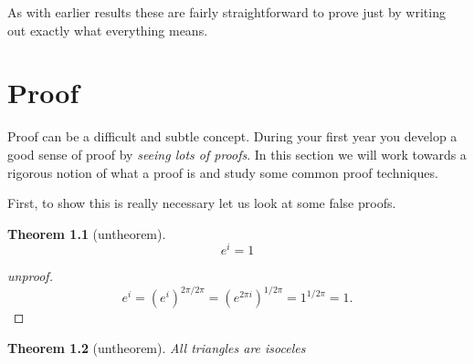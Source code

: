 \documentclass[
]{book}
\newtheorem{theorem}{Theorem}[chapter]
\theoremstyle{definition}
\theoremstyle{definition}
\theoremstyle{definition}
\theoremstyle{definition}
\theoremstyle{remark}
\begin{document}
As with earlier results these are fairly straightforward to prove just by writing out exactly what everything means.

\chapter{Proof}\label{proof}

Proof can be a difficult and subtle concept. During your first year you develop a good sense of proof by \emph{seeing lots of proofs}. In this section we will work towards a rigorous notion of what a proof is and study some common proof techniques.

First, to show this is really necessary let us look at some false proofs.

\begin{theorem}[untheorem]
\[e^i =1\]
\end{theorem}

\begin{proof}[unproof]
\[ e^i = (e^i)^{2\pi/2\pi} = (e^{2\pi i})^{1/2\pi} = 1^{1/2\pi} = 1.\]
\end{proof}

\begin{theorem}[untheorem]
All triangles are isoceles
\end{theorem}
\end{document}
